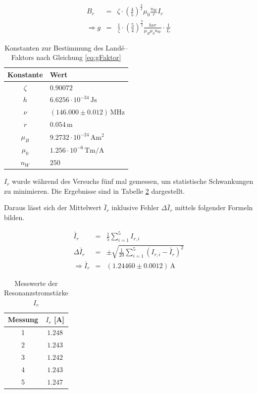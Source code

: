 \documentclass[12pt,a4paper]{scrartcl}
\numberwithin{equation}{section} %
\begin{document}
\begin{eqnarray}
	B_r &=& \zeta \cdot
			\left(\frac{4}{5}\right)^{\frac{3}{2}}
			\mu_0 \frac{n_W}{r} I_r
			\label{eq:b_r} \\
	\Rightarrow g &=& \frac{1}{\zeta} \cdot
			\left(\frac{5}{4}\right)^{\frac{3}{2}}
			\frac{h \nu r}{\mu_B \mu_0 n_W} \cdot \frac{1}{I_r}
			\label{eq:gFaktor}
\end{eqnarray}

\begin{table}[h!]
	\centering
	\begin{tabular}{c|l}
		Konstante & Wert \\
		\hline
		$\zeta$ & $0.90072$ \\
		$h$ & $6.6256 \cdot 10^{-34} \mathrm{\, Js}$ \\
		$\nu$ & $(146.000 \pm 0.012) \mathrm{\, MHz} $ \\
		$r$ & $0.054 \mathrm{\, m}$ \\
		$\mu_B$ & $9.2732 \cdot 10^{-24} \mathrm{\, Am^2}$ \\
		$\mu_0$ & $1.256 \cdot 10^{-6} \mathrm{\, Tm/A}$ \\
		$n_W$ & $250$ \\
	\end{tabular}
	\caption{Konstanten zur Bestimmung des Landé--Faktors nach Gleichung \eqref{eq:gFaktor}}
	\label{table:konstanten}
\end{table}

\noindent
$I_r$ wurde während des Versuchs fünf mal gemessen, um statistische Schwankungen zu minimieren. Die Ergebnisse sind in Tabelle \ref{table:I_r} dargestellt.

Daraus lässt sich der Mittelwert $\bar{I}_r$ inklusive Fehler $\Delta \bar{I}_r$ mittels folgender Formeln bilden.

\begin{eqnarray}
	\bar{I}_r &=& \frac{1}{5} \sum_{i=1}^{5} I_{r,i} \\
	\Delta \bar{I}_r &=& \pm\sqrt{\frac{1}{20} \sum_{i=1}^{5} (I_{r,i} - \bar{I}_r)^2} \\
	\Rightarrow \bar I_r &=& (1.24460 \pm 0.0012) \mathrm{\, A}
\end{eqnarray}

\begin{table}[h!]
	\centering
	\begin{tabular}{c|c}
		Messung & $I_r$ [A] \\
		\hline
		1 & $1.248$ \\
		2 & $1.243$ \\
		3 & $1.242$ \\
		4 & $1.243$ \\
		5 & $1.247$ \\
	\end{tabular}
	\caption{Messwerte der Resonanzstromstärke $I_r$}
	\label{table:I_r}
\end{table}
\end{document}
